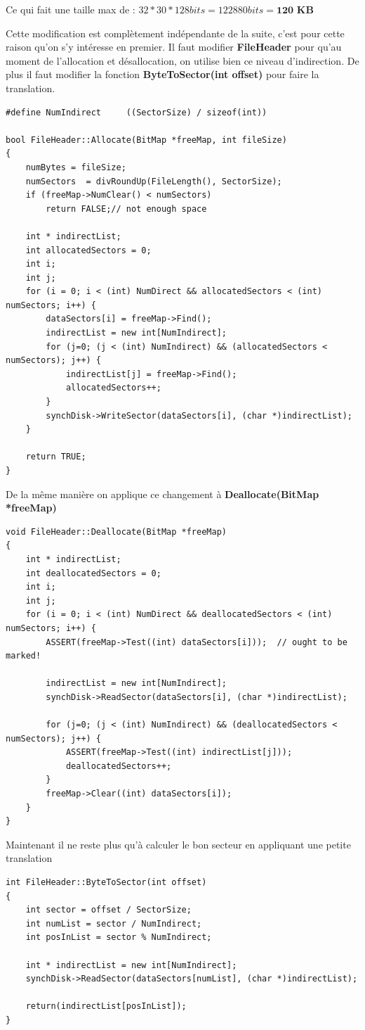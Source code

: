 \documentclass[a4paper,10pt]{article}
\begin{document}
Ce qui fait une taille max de : $32 * 30 * 128 bits = 122880 bits =
\textbf{120 KB}$

Cette modification est complètement indépendante de la suite, c'est pour cette
raison qu'on s'y intéresse en premier. Il faut modifier \textbf{FileHeader}
pour qu'au moment de l'allocation et désallocation, on utilise bien ce niveau
d'indirection. De plus il faut modifier la fonction \textbf{ByteToSector(int
offset)} pour faire la translation.

\begin{lstlisting}
#define NumIndirect     ((SectorSize) / sizeof(int))

bool FileHeader::Allocate(BitMap *freeMap, int fileSize)
{
    numBytes = fileSize;
    numSectors  = divRoundUp(FileLength(), SectorSize);
    if (freeMap->NumClear() < numSectors)
        return FALSE;// not enough space

    int * indirectList;
    int allocatedSectors = 0;
    int i;
    int j;
    for (i = 0; i < (int) NumDirect && allocatedSectors < (int) numSectors; i++) {
        dataSectors[i] = freeMap->Find();
        indirectList = new int[NumIndirect];
        for (j=0; (j < (int) NumIndirect) && (allocatedSectors < numSectors); j++) {
            indirectList[j] = freeMap->Find();
            allocatedSectors++;
        }
        synchDisk->WriteSector(dataSectors[i], (char *)indirectList);
    }

    return TRUE;
}
\end{lstlisting}

De la même manière on applique ce changement à \textbf{Deallocate(BitMap
*freeMap)}
\begin{lstlisting}
void FileHeader::Deallocate(BitMap *freeMap)
{
    int * indirectList;
    int deallocatedSectors = 0;
    int i;
    int j;
    for (i = 0; i < (int) NumDirect && deallocatedSectors < (int) numSectors; i++) {
        ASSERT(freeMap->Test((int) dataSectors[i]));  // ought to be marked!

        indirectList = new int[NumIndirect];
        synchDisk->ReadSector(dataSectors[i], (char *)indirectList);

        for (j=0; (j < (int) NumIndirect) && (deallocatedSectors < numSectors); j++) {
            ASSERT(freeMap->Test((int) indirectList[j]));
            deallocatedSectors++;
        }
        freeMap->Clear((int) dataSectors[i]);
    }
}
\end{lstlisting}

Maintenant il ne reste plus qu'à calculer le bon secteur en appliquant une
petite translation
\begin{lstlisting}
int FileHeader::ByteToSector(int offset)
{
    int sector = offset / SectorSize;
    int numList = sector / NumIndirect;
    int posInList = sector % NumIndirect;

    int * indirectList = new int[NumIndirect];
    synchDisk->ReadSector(dataSectors[numList], (char *)indirectList);

    return(indirectList[posInList]);
}
\end{lstlisting}
\end{document}
